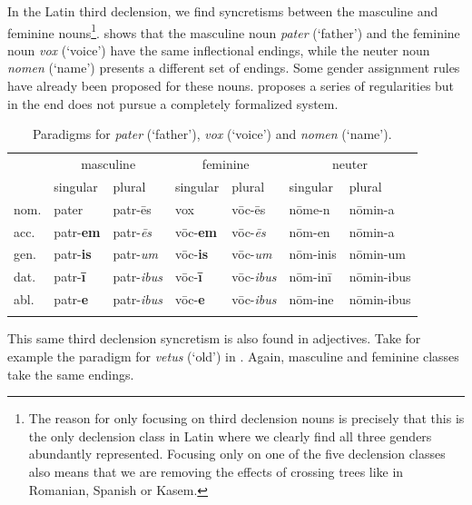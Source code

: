 
In the Latin third declension, we find syncretisms between the masculine and feminine nouns\footnote{The reason for only focusing on third declension nouns is precisely that this is the only declension class in Latin where we clearly find all three genders abundantly represented. Focusing only on one of the five declension classes also means that we are removing the effects of crossing trees like in Romanian, Spanish or Kasem.}.  shows that the masculine noun \textit{pater} (`father') and the feminine noun \textit{vox} (`voice') have the same inflectional endings, while the neuter noun \textit{nomen} (`name') presents a different set of endings. Some gender assignment rules have already been proposed for these nouns. \textcite{Aronoff.1994} proposes a series of regularities but in the end does not pursue a completely formalized system.

\begin{table}
  \centering
  \begin{tabular}{lllllll}
    \lsptoprule
    & \multicolumn{2}{c}{masculine} & \multicolumn{2}{c}{feminine} & \multicolumn{2}{c}{neuter} \\

         & singular & plural    & singular & plural   & singular & plural     \\
    \midrule
    nom. & pater    & patr-ēs   & vox      & vōc-ēs   & nōme-n    & nōmin-a     \\
    acc. & patr-\textbf{em}  & patr-\textit{ēs}   & vōc-\textbf{em}   & vōc-\textit{ēs}   & nōm-en   & nōmin-a    \\
    gen. & patr-\textbf{is}  & patr-\textit{um}   & vōc-\textbf{is}   & vōc-\textit{um}   & nōm-inis & nōmin-um   \\
    dat. & patr-\textbf{ī}   & patr-\textit{ibus} & vōc-\textbf{ī}    & vōc-\textit{ibus} & nōm-inī  & nōmin-ibus \\
    abl. & patr-\textbf{e}   & patr-\textit{ibus} & vōc-\textbf{e}    & vōc-\textit{ibus} & nōm-ine  & nōmin-ibus \\
    \lspbottomrule
  \end{tabular}\caption{Paradigms for \textit{pater} (`father'), \textit{vox} (`voice') and \textit{nomen} (`name').}\label{tab:paradigm-third-nouns-lat}
\end{table}

This same third declension syncretism is also found in adjectives. Take for example the paradigm for \textit{vetus} (`old') in . Again, masculine and feminine classes take the same endings.

